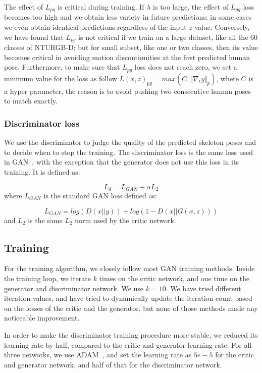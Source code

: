 \documentclass[10pt,twocolumn,letterpaper]{article}
\begin{document}
The effect of $L_{pg}$ is critical during training. If $\lambda$ is too large, the effect of $L_{pg}$ loss becomes too high and we obtain less variety in future predictions; in some cases we even obtain identical predictions regardless of the input $z$ value. Conversely, we have found that $L_{pg}$ is not critical if we train on a large dataset, like all the 60 classes of NTURGB-D; but for small subset, like one or two classes, then its value becomes critical in avoiding motion discontinuities at the first predicted human pose. Furthermore, to make sure that $L_{pg}$ loss does not reach zero, we set a minimum value for the loss as follow $L(x,z)_{pg}=max(C,\Vert\nabla_{t}y\Vert_{p})$, where $C$ is a hyper parameter, the reason is to avoid pushing two consecutive human poses to match exactly. 

\subsubsection{Discriminator loss}
We use the discriminator to judge the quality of the predicted skeleton poses and to decide when to stop the training. The discriminator loss is the same loss used in GAN~\cite{nips2014:Goodfellow}, with the exception that the generator does not use this loss in its training. It is defined as:

\begin{equation}
L_{d}=L_{GAN}+\alpha L_{2}
\label{eq:discriminator_total_loss}
\end{equation}
where $L_{GAN}$ is the standard GAN loss defined as:

\begin{equation}
L_{GAN}=log(D(x||y))+log(1-D(x||G(x,z)))
\label{eq:discriminator_loss}
\end{equation}
and $L_{2}$ is the same $L_{2}$ norm used by the critic network.

\subsection{Training}
For the training algorithm, we closely follow most GAN training methods. Inside the training loop, we iterate $k$ times on the critic network, and one time on the generator and discriminator network. We use $k = 10$. We have tried different iteration values, and have tried to dynamically update the iteration count based on the losses of the critic and the generator, but none of those methods made any noticeable improvement.

In order to make the discriminator training procedure more stable, we reduced its learning rate by half, compared to the critic and generator learning rate. For all three networks, we use ADAM~\cite{corr2014:Kingma}, and set the learning rate as $5e-5$ for the critic and generator network, and half of that for the discriminator network.
\end{document}
